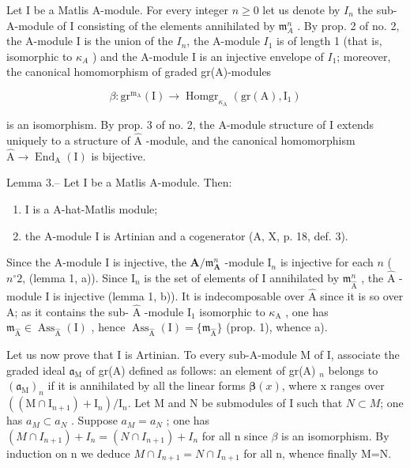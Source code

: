Let I be a Matlis A-module. For every integer \(n \geqslant 0\) let us denote by \(I_n\) the sub-A-module of I consisting of the elements annihilated by \(\mathfrak{m}_A^n\) . By prop. 2 of no. 2, the A-module I is the union of the \(I_n\), the A-module \(I_1\) is of length 1 (that is, isomorphic to \(\kappa_A\) ) and the A-module I is an injective envelope of \(I_1\); moreover, the canonical homomorphism of graded gr(A)-modules

\[
\beta : \mathrm{gr} ^ {\mathrm{m} _ {\mathrm{A}}} (\mathrm{I}) \longrightarrow \operatorname{Homgr} _ {\kappa_ {\mathrm{A}}} (\mathrm{gr} (\mathrm{A}), \mathrm{I} _ {1})\tag{3}
\]

is an isomorphism. By prop. 3 of no. 2, the A-module structure of I extends uniquely to a structure of \(\widehat{\mathrm{A}}\) -module, and the canonical homomorphism \(\widehat{\mathrm{A}} \to \operatorname{End}_{\mathrm{A}}(\mathrm{I})\) is bijective.

Lemma 3.-- Let I be a Matlis A-module. Then:

\begin{enumerate}
\def\labelenumi{\alph{enumi})}
\item
  I is a A-hat-Matlis module;
\item
  the A-module I is Artinian and a cogenerator (A, X, p. 18, def. 3).
\end{enumerate}

Since the A-module I is injective, the \(\mathbf{A} / \mathfrak{m}_{\mathbf{A}}^{n}\) -module \(\mathrm{I}_n\) is injective for each \(n\) ( \(n^{\circ}2\), (lemma 1, a)). Since \(\mathrm{I}_n\) is the set of elements of I annihilated by \(\mathfrak{m}_{\widehat{\mathrm{A}}}^{n}\) , the \(\widehat{\mathrm{A}}\) -module I is injective (lemma 1, b)). It is indecomposable over \(\widehat{\mathrm{A}}\) since it is so over \(\mathrm{A}\); as it contains the sub- \(\widehat{\mathrm{A}}\) -module \(\mathrm{I}_1\) isomorphic to \(\kappa_{\mathrm{A}}\) , one has \(\mathfrak{m}_{\widehat{\mathrm{A}}} \in \operatorname{Ass}_{\widehat{\mathrm{A}}}(\mathrm{I})\) , hence \(\operatorname{Ass}_{\widehat{\mathrm{A}}}(\mathrm{I}) = \{\mathfrak{m}_{\widehat{\mathrm{A}}}\}\) (prop. 1), whence a).

Let us now prove that I is Artinian. To every sub-A-module M of I, associate the graded ideal \(\mathfrak{a}_{\mathrm{M}}\) of gr(A) defined as follows: an element of gr(A) \(_n\) belongs to \((\mathfrak{a}_{\mathrm{M}})_{n}\) if it is annihilated by all the linear forms \(\boldsymbol{\beta}(x)\), where x ranges over \(\left((\mathrm{M}\cap\mathrm{I}_{n+1})+\mathrm{I}_{n}\right)/\mathrm{I}_{n}\). Let M and N be submodules of I such that \(N\subset M\); one has \(a_{M}\subset a_{N}\) . Suppose \(a_{M}=a_{N}\) ; one has \((M\cap I_{n+1})+I_{n}=(N\cap I_{n+1})+I_{n}\) for all n since \(\beta\) is an isomorphism. By induction on n we deduce \(M\cap I_{n+1}=N\cap I_{n+1}\) for all n, whence finally M=N.

